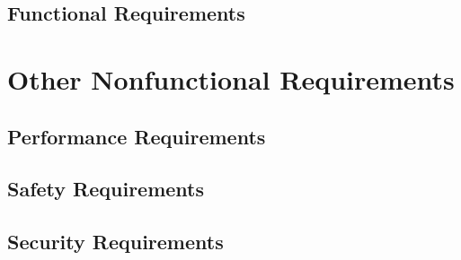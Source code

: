 \documentclass{scrreprt}
\begin{document}
\section{Functional Requirements}


\chapter{Other Nonfunctional Requirements}

\section{Performance Requirements}

\section{Safety Requirements}

\section{Security Requirements}
\end{document}
